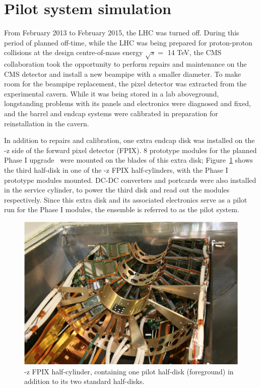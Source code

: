 \section{Pilot system simulation\label{sec:matbudg-pilot}}

From February 2013 to February 2015, the LHC was turned off. During this period of planned off-time, while the LHC was being prepared for proton-proton collisions at the design centre-of-mass energy $\sqrt{s} =$ 14 TeV, the CMS collaboration took the opportunity to perform repairs and maintenance on the CMS detector and install a new beampipe with a smaller diameter. To make room for the beampipe replacement, the pixel detector was extracted from the experimental cavern. While it was being stored in a lab aboveground, longstanding problems with its panels and electronics were diagnosed and fixed, and the barrel and endcap systems were calibrated in preparation for reinstallation in the cavern.

In addition to repairs and calibration, one extra endcap disk was installed on the -z side of the forward pixel detector (FPIX). 8 prototype modules for the planned Phase I upgrade~\cite{Dominguez:1481838} were mounted on the blades of this extra disk; Figure~\ref{fig:pilotmodules_actual} shows the third half-disk in one of the -z FPIX half-cylinders, with the Phase I prototype modules mounted. DC-DC converters and portcards were also installed in the service cylinder, to power the third disk and read out the modules respectively. Since this extra disk and its associated electronics serve as a pilot run for the Phase I modules, the ensemble is referred to as the pilot system.

\begin{figure}[hbtp]
  \begin{center}
    \includegraphics[width=\cmsFigWidth]{figures/Modules}
    \caption{-z FPIX half-cylinder, containing one pilot half-disk (foreground) in addition to its two standard half-disks.}
    \label{fig:pilotmodules_actual}
  \end{center}
\end{figure}

